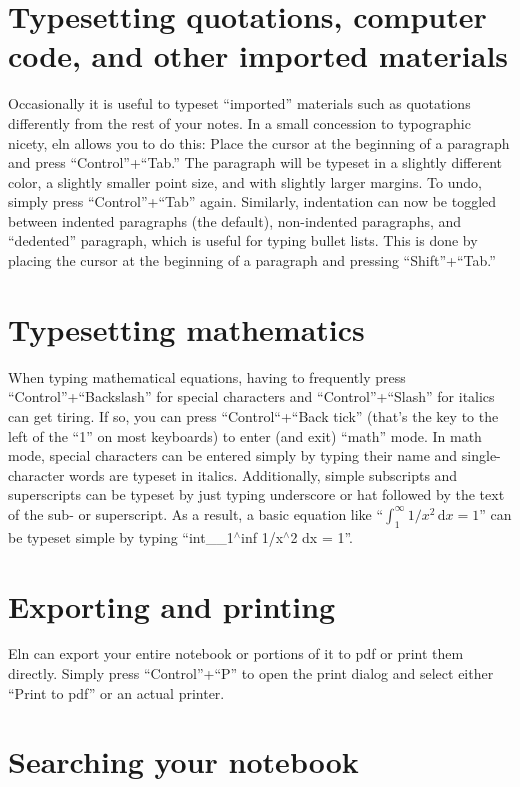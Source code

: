\documentclass[11pt]{report}
\begin{document}
\section{Typesetting quotations, computer code, and other imported materials}

Occasionally it is useful to typeset ``imported'' materials such as
quotations differently from the rest of your notes. In a small
concession to typographic nicety, eln allows you to do this: Place
the cursor at
the beginning of a paragraph and press ``Control''+``Tab.'' The
paragraph will be typeset in a slightly different color, a slightly
smaller point size, and with slightly larger margins. To undo, simply
press ``Control''+``Tab'' again. Similarly, indentation can now be
toggled between indented paragraphs (the default), non-indented
paragraphs, and ``dedented'' paragraph, which is useful for typing
bullet lists. This is done by placing the cursor at the beginning of a
paragraph and pressing ``Shift''+``Tab.''

\section{Typesetting mathematics}

When typing mathematical equations, having to frequently press
``Control''+``Backslash'' for special characters and
``Control''+``Slash'' for italics can get tiring. If so, you can press
``Control``+``Back tick'' (that's the key to the left of the ``1'' on
most keyboards) to enter (and exit) ``math'' mode. In math mode,
special characters can be entered simply by typing their name and
single-character words are typeset in italics. Additionally, simple
subscripts and superscripts can be typeset by just typing underscore
or hat followed by the text of the sub- or superscript. As a result, a
basic equation like ``$\int_1^\infty 1/x^2\, \mathrm{d}x = 1$'' can be typeset simple
by typing ``int\_$\!$\_1$^\wedge$inf 1/x$^\wedge$2 dx = 1''.

\section{Exporting and printing}

Eln can export your entire notebook or portions of it to pdf or print
them directly. Simply press ``Control''+``P'' to open the print dialog
and select either ``Print to pdf'' or an actual printer.

\section{Searching your notebook}
\end{document}
